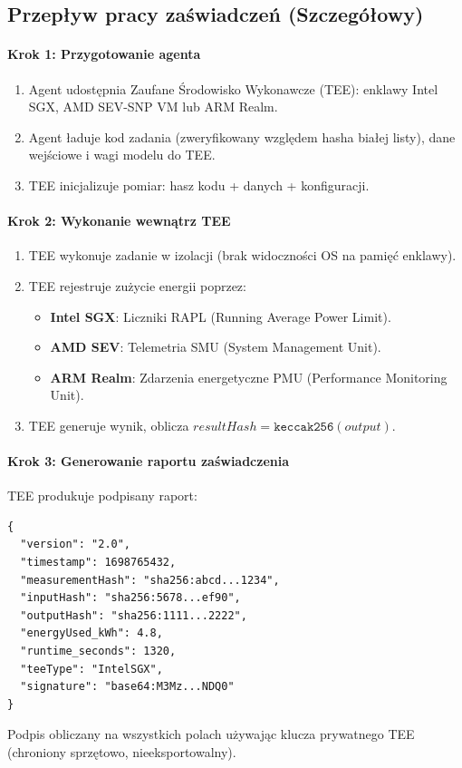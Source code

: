 \documentclass[11pt]{article}
\begin{document}
\subsection{Przepływ pracy zaświadczeń (Szczegółowy)}
\label{sec:attestation-workflow}
\paragraph{Krok 1: Przygotowanie agenta}
\begin{enumerate}[noitemsep]
  \item Agent udostępnia Zaufane Środowisko Wykonawcze (TEE): enklawy Intel SGX, AMD SEV-SNP VM lub ARM Realm.
  \item Agent ładuje kod zadania (zweryfikowany względem hasha białej listy), dane wejściowe i wagi modelu do TEE.
  \item TEE inicjalizuje pomiar: hasz kodu + danych + konfiguracji.
\end{enumerate}

\paragraph{Krok 2: Wykonanie wewnątrz TEE}
\begin{enumerate}[noitemsep]
  \item TEE wykonuje zadanie w izolacji (brak widoczności OS na pamięć enklawy).
  \item TEE rejestruje zużycie energii poprzez:
    \begin{itemize}[noitemsep]
      \item \textbf{Intel SGX}: Liczniki RAPL (Running Average Power Limit).
      \item \textbf{AMD SEV}: Telemetria SMU (System Management Unit).
      \item \textbf{ARM Realm}: Zdarzenia energetyczne PMU (Performance Monitoring Unit).
    \end{itemize}
  \item TEE generuje wynik, oblicza $resultHash = \texttt{keccak256}(output)$.
\end{enumerate}

\paragraph{Krok 3: Generowanie raportu zaświadczenia}
TEE produkuje podpisany raport:
\begin{verbatim}
{
  "version": "2.0",
  "timestamp": 1698765432,
  "measurementHash": "sha256:abcd...1234",
  "inputHash": "sha256:5678...ef90",
  "outputHash": "sha256:1111...2222",
  "energyUsed_kWh": 4.8,
  "runtime_seconds": 1320,
  "teeType": "IntelSGX",
  "signature": "base64:M3Mz...NDQ0"
}
\end{verbatim}
Podpis obliczany na wszystkich polach używając klucza prywatnego TEE (chroniony sprzętowo, nieeksportowalny).
\end{document}
